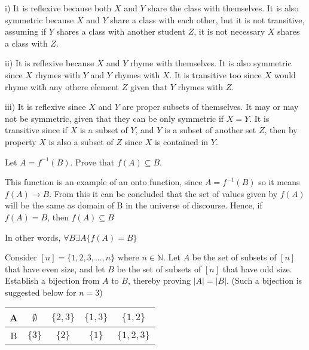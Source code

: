 \documentclass[addpoints]{exam}
\begin{document}
\begin{questions}
\begin{parts}
  \begin{solution}

i) It is reflexive because both $X$ and $Y$ share the class with themselves. It is also symmetric because $X$ and $Y$ share a class with each other, but it is not transitive, assuming if $Y$ shares a class with another student $Z$, it is not necessary $X$ shares a class with $Z$.

ii) It is reflexive because $X$ and $Y$ rhyme with themselves. It is also symmetric since $X$ rhymes with $Y$ and $Y$ rhymes with $X$. It is transitive too since $X$ would rhyme with any othere element $Z$ given that $Y$ rhymes with $Z$.

iii) It is reflexive since $X$ and $Y$ are proper subsets of themselves. It may or may not be symmetric, given that they can be only symmetric if $X=Y$. It is transitive since if $X$ is a subset of $Y$, and $Y$ is a subset of another set $Z$, then by property $X$ is also a subset of $Z$ since $X$ is contained in $Y$.

  \end{solution}

\end{parts}

\question[15] Let $A = f^{-1}(B)$. Prove that $f(A) \subseteq B$.
  \begin{solution}
  
This function is an example of an onto function, since $A = f^{-1}(B)$ so it means $f(A) \rightarrow B$. From this it can be concluded that the set of values given by $f(A)$ will be the same as domain of B in the universe of discourse. Hence, if $f(A)=B$, then $f(A) \subseteq B$

In other words, $\forall B \exists A \{ f(A)=B \} $
  \end{solution}

\question[15] Consider $[n] = \{1,2,3,...,n\}$ where $n \in \mathbb{N}$. Let $A$ be the set of subsets of $[n]$ that have even size, and let $B$ be the set of subsets of $[n]$ that have odd size. Establish a bijection from $A$ to $B$, thereby proving $|A| = |B|$. (Such a bijection is suggested below for $n = 3$) 

\begin{center}

  \begin{tabular}{ |c || c | c | c |c |}
    \hline
 A & $\emptyset$ & $\{2,3\}$ & $\{1,3\}$ & $\{1,2\}$ \\ \hline
 B & $\{3\}$ & $\{2\}$ & $\{1\}$ & $\{1,2,3\}$\\\hline
\end{tabular}
\end{center}


\end{questions}
\end{document}
